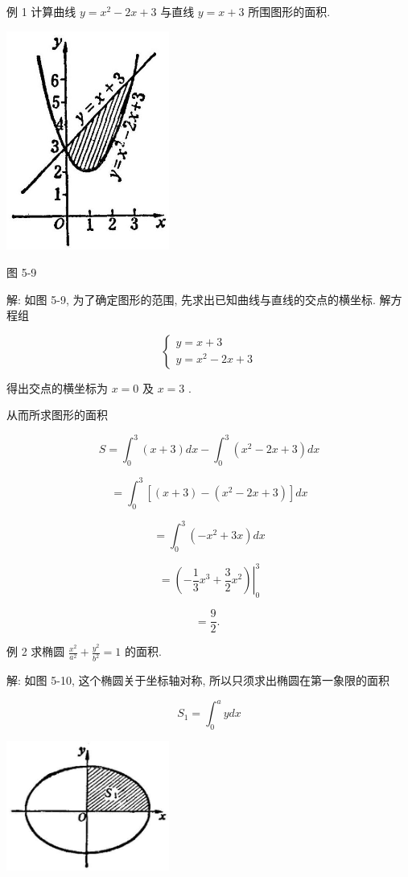 \documentclass[lang=cn,newtx,10pt,scheme=chinese]{elegantbook}
\begin{document}
例 1 计算曲线 \(y = {x}^{2} - {2x} + 3\) 与直线 \(y = x + 3\) 所围图形的面积.

\begin{center}
\includegraphics[max width=0.4\textwidth]{images/01912c18-5c3f-733d-b775-749ba9897a9d_232_503568.jpg}
\end{center}

图 5-9

解: 如图 5-9, 为了确定图形的范围, 先求出已知曲线与直线的交点的横坐标. 解方程组

\[
\left\{ \begin{array}{l} y = x + 3 \\ y = {x}^{2} - {2x} + 3 \end{array}\right.
\]

得出交点的横坐标为 \(x = 0\) 及 \(x = 3\) .

从而所求图形的面积

\[
S = {\int }_{0}^{3}\left( {x + 3}\right) {dx} - {\int }_{0}^{3}\left( {{x}^{2} - {2x} + 3}\right) {dx}
\]

\[
= {\int }_{0}^{3}\left\lbrack {\left( {x + 3}\right) - \left( {{x}^{2} - {2x} + 3}\right) }\right\rbrack {dx}
\]

\[
= {\int }_{0}^{3}\left( {-{x}^{2} + {3x}}\right) {dx}
\]

\[
= {\left. \left( -\frac{1}{3}{x}^{3} + \frac{3}{2}{x}^{2}\right) \right| }_{0}^{3}
\]

\[
= \frac{9}{2}\text{. }
\]

例 2 求椭圆 \(\frac{{x}^{2}}{{a}^{2}} + \frac{{y}^{2}}{{b}^{2}} = 1\) 的面积.

解: 如图 5-10, 这个椭圆关于坐标轴对称, 所以只须求出椭圆在第一象限的面积

\[
{S}_{1} = {\int }_{0}^{a}{ydx}
\]

\begin{center}
\includegraphics[max width=0.4\textwidth]{images/01912c18-5c3f-733d-b775-749ba9897a9d_233_497776.jpg}
\end{center}
\end{document}
